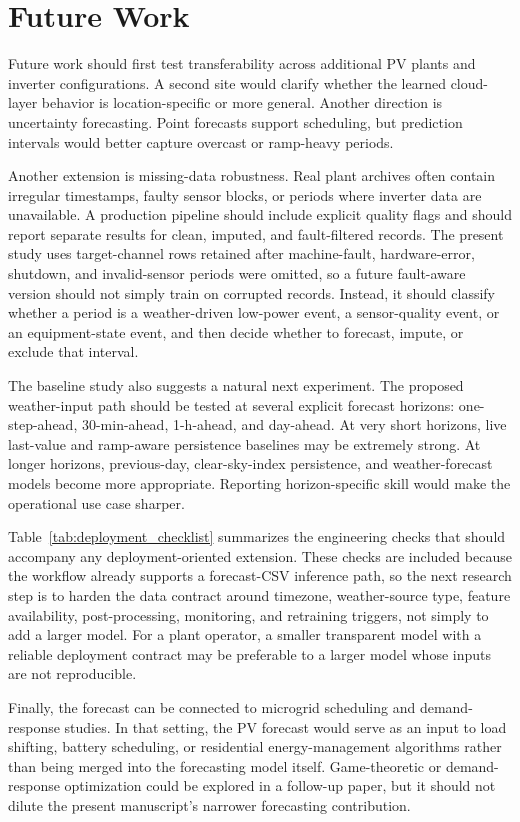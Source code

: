 \section{Future Work}
\label{sec:future}



Future work should first test transferability across additional PV plants and inverter configurations. A second site would clarify whether the learned cloud-layer behavior is location-specific or more general. Another direction is uncertainty forecasting. Point forecasts support scheduling, but prediction intervals would better capture overcast or ramp-heavy periods.

Another extension is missing-data robustness. Real plant archives often contain irregular timestamps, faulty sensor blocks, or periods where inverter data are unavailable. A production pipeline should include explicit quality flags and should report separate results for clean, imputed, and fault-filtered records. The present study uses target-channel rows retained after machine-fault, hardware-error, shutdown, and invalid-sensor periods were omitted, so a future fault-aware version should not simply train on corrupted records. Instead, it should classify whether a period is a weather-driven low-power event, a sensor-quality event, or an equipment-state event, and then decide whether to forecast, impute, or exclude that interval.

The baseline study also suggests a natural next experiment. The proposed weather-input path should be tested at several explicit forecast horizons: one-step-ahead, 30-min-ahead, 1-h-ahead, and day-ahead. At very short horizons, live last-value and ramp-aware persistence baselines may be extremely strong. At longer horizons, previous-day, clear-sky-index persistence, and weather-forecast models become more appropriate. Reporting horizon-specific skill would make the operational use case sharper.

Table~\ref{tab:deployment_checklist} summarizes the engineering checks that should accompany any deployment-oriented extension. These checks are included because the workflow already supports a forecast-CSV inference path, so the next research step is to harden the data contract around timezone, weather-source type, feature availability, post-processing, monitoring, and retraining triggers, not simply to add a larger model. For a plant operator, a smaller transparent model with a reliable deployment contract may be preferable to a larger model whose inputs are not reproducible.

Finally, the forecast can be connected to microgrid scheduling and demand-response studies. In that setting, the PV forecast would serve as an input to load shifting, battery scheduling, or residential energy-management algorithms rather than being merged into the forecasting model itself. Game-theoretic or demand-response optimization could be explored in a follow-up paper, but it should not dilute the present manuscript's narrower forecasting contribution.
